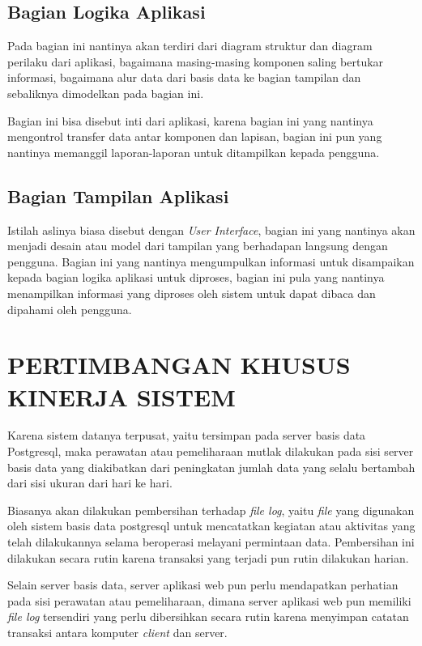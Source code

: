 \documentclass[pdftex,12pt, oneside]{article}
\begin{document}
\subsection{Bagian Logika Aplikasi}

Pada bagian ini nantinya akan terdiri dari diagram struktur dan diagram perilaku dari aplikasi, bagaimana masing-masing komponen saling bertukar informasi, bagaimana alur data dari basis data ke bagian tampilan dan sebaliknya dimodelkan pada bagian ini.

Bagian ini bisa disebut inti dari aplikasi, karena bagian ini yang nantinya mengontrol transfer data antar komponen dan lapisan, bagian ini pun yang nantinya memanggil laporan-laporan untuk ditampilkan kepada pengguna.

\subsection{Bagian Tampilan Aplikasi}

Istilah aslinya biasa disebut dengan \textit{User Interface}, bagian ini yang nantinya akan menjadi desain atau model dari tampilan yang berhadapan langsung dengan pengguna. Bagian ini yang nantinya mengumpulkan informasi untuk disampaikan kepada bagian logika aplikasi untuk diproses, bagian ini pula yang nantinya menampilkan informasi yang diproses oleh sistem untuk dapat dibaca dan dipahami oleh pengguna.

\section{PERTIMBANGAN KHUSUS KINERJA SISTEM}

Karena sistem datanya terpusat, yaitu tersimpan pada server basis data Postgresql, maka perawatan atau pemeliharaan mutlak dilakukan pada sisi server basis data yang diakibatkan dari peningkatan jumlah data yang selalu bertambah dari sisi ukuran dari hari ke hari.

Biasanya akan dilakukan pembersihan terhadap \textit{file log}, yaitu \textit{file} yang digunakan oleh sistem basis data postgresql untuk mencatatkan kegiatan atau aktivitas yang telah dilakukannya selama beroperasi melayani permintaan data. Pembersihan ini dilakukan secara rutin karena transaksi yang terjadi pun rutin dilakukan harian.

Selain server basis data, server aplikasi web pun perlu mendapatkan perhatian pada sisi perawatan atau pemeliharaan, dimana server aplikasi web pun memiliki \textit{file log} tersendiri yang perlu dibersihkan secara rutin karena menyimpan catatan transaksi antara komputer \textit{client} dan server.
\end{document}
